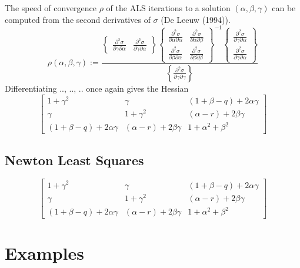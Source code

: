 \documentclass[
  12pt,
]{article}
\begin{document}
The speed of convergence \(\rho\) of the ALS iterations to a solution \((\alpha,\beta,\gamma)\) can be computed from the second derivatives of \(\sigma\) (De Leeuw (1994)).
\begin{equation}
\rho(\alpha,\beta,\gamma):= \frac{
\left\{\begin{matrix}\frac{\partial^2\sigma}{\partial\gamma\partial\alpha}&\frac{\partial^2\sigma}{\partial\gamma\partial\alpha}\end{matrix}\right\}
\left\{\begin{matrix}\frac{\partial^2\sigma}{\partial\alpha\partial\alpha}&\frac{\partial^2\sigma}{\partial\alpha\partial\beta}\\\frac{\partial^2\sigma}{\partial\beta\partial\alpha}&\frac{\partial^2\sigma}{\partial\beta\partial\beta}\end{matrix}\right\}^{-1}
\left\{\begin{matrix}\frac{\partial^2\sigma}{\partial\gamma\partial\alpha}\\\frac{\partial^2\sigma}{\partial\gamma\partial\alpha}\end{matrix}\right\}}
{\left\{\frac{\partial^2\sigma}{\partial\gamma\partial\gamma}\right\}}
\end{equation}
Differentiating .., .., .. once again gives the Hessian
\[
\begin{bmatrix}
1+\gamma^2&\gamma&(1+\beta-q)+2\alpha\gamma\\
\gamma&1+\gamma^2&(\alpha-r)+2\beta\gamma\\
(1+\beta-q)+2\alpha\gamma&(\alpha-r)+2\beta\gamma&1+\alpha^2+\beta^2
\end{bmatrix}
\]

\subsection{Newton Least Squares}\label{newton-least-squares}

\[
\begin{bmatrix}
1+\gamma^2&\gamma&(1+\beta-q)+2\alpha\gamma\\
\gamma&1+\gamma^2&(\alpha-r)+2\beta\gamma\\
(1+\beta-q)+2\alpha\gamma&(\alpha-r)+2\beta\gamma&1+\alpha^2+\beta^2
\end{bmatrix}
\]

\section{Examples}\label{examples}
\end{document}
